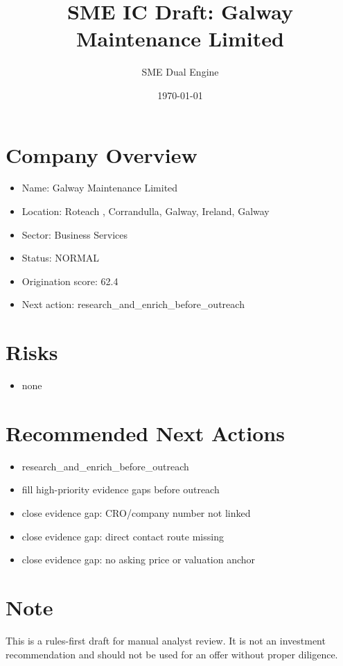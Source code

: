 \documentclass[11pt,a4paper]{article}
\title{SME IC Draft: Galway Maintenance Limited}
\author{SME Dual Engine}
\date{\today}
\begin{document}
\maketitle
\section*{Company Overview}
\begin{itemize}[leftmargin=1.4em]
\item Name: Galway Maintenance Limited
\item Location: Roteach , Corrandulla, Galway, Ireland, Galway
\item Sector: Business Services
\item Status: NORMAL
\item Origination score: 62.4
\item Next action: research\_and\_enrich\_before\_outreach
\end{itemize}
\section*{Risks}
\begin{itemize}[leftmargin=1.4em]
\item none
\end{itemize}
\section*{Recommended Next Actions}
\begin{itemize}[leftmargin=1.4em]
\item research\_and\_enrich\_before\_outreach
\item fill high-priority evidence gaps before outreach
\item close evidence gap: CRO/company number not linked
\item close evidence gap: direct contact route missing
\item close evidence gap: no asking price or valuation anchor
\end{itemize}
\section*{Note}
This is a rules-first draft for manual analyst review. It is not an investment
recommendation and should not be used for an offer without proper diligence.
\end{document}
